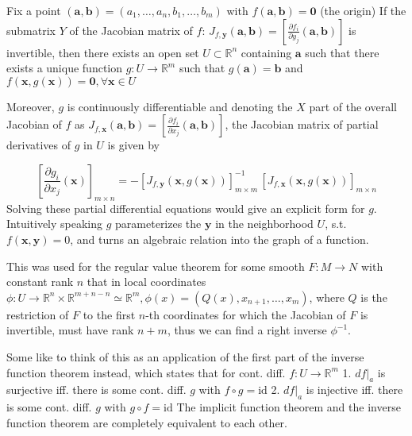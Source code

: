 Fix a point \( (\textbf{a}, \textbf{b}) = (a_1, \dots, a_n, b_1, \dots, b_m) \) with \( f(\textbf{a}, \textbf{b}) = \textbf{0} \) (the origin)
If the submatrix \( Y \) of the Jacobian matrix of \( f \):
\( J_{f, \mathbf{y}} (\mathbf{a}, \mathbf{b}) = \left [ \frac{\partial f_i}{\partial y_j} (\mathbf{a}, \mathbf{b}) \right ] \)
is invertible, then there exists an open set \( U \subset \mathbb{R}^n\) containing \( \textbf{a} \) such that there exists a unique function 
\( g: U \to \mathbb{R}^m \) such that \( g(\mathbf{a}) = \mathbf{b} \) and \( f(\mathbf{x}, g(\mathbf{x})) = \mathbf{0}, \forall \mathbf{x} \in U \)   

Moreover, \( g \) is continuously differentiable and denoting the \( X \) part of the overall Jacobian of \( f \) as
\(J_{f, \mathbf{x}} (\mathbf{a}, \mathbf{b}) = \left [ \frac{\partial f_i}{\partial x_j} (\mathbf{a}, \mathbf{b}) \right ]\),
the Jacobian matrix of partial derivatives of \( g \) in \( U \) is given by 

\[
\left[\frac{\partial g_i}{\partial x_j} (\mathbf{x})\right]_{m\times n} =- \left [ J_{f, \mathbf{y}}(\mathbf{x}, g(\mathbf{x})) \right ]_{m \times m} ^{-1} \, \left [ J_{f, \mathbf{x}}(\mathbf{x}, g(\mathbf{x})) \right ]_{m \times n}
\]
Solving these partial differential equations would give an explicit form for \( g \).
Intuitively speaking \( g \) parameterizes the \( \textbf{y} \) in the neighborhood \( U \), s.t. \( f(\textbf{x}, \textbf{y}) = 0 \),
and turns an algebraic relation into the graph of a function.


This was used for the regular value theorem for some smooth \( F : M \to N \) with constant rank \( n \) that 
in local coordinates \( \phi : U \to \mathbb{R}^{n} \times \mathbb{R}^{m+n-n} \simeq \mathbb{R}^{m}, \phi(x) = (Q(x), x_{n+1}, \dots, x_m) \),
where \( Q \) is the restriction of \( F \) to the first \( n \)-th coordinates for which the Jacobian of \( F \) is invertible,
must have rank \( n+m \), thus we can find a right inverse \( \phi^{-1} \).

Some like to think of this as an application of the first part of the inverse function theorem instead, which states
that for cont. diff. \( f : U \to \mathbb{R}^{m} \)
1. \( df|_a \) is surjective iff. there is some cont. diff. \( g \) with \( f \circ g = \text{id} \)
2. \( df|_a \) is injective iff. there is some cont. diff. \( g \) with \( g \circ f = \text{id} \)
The implicit function theorem and the inverse function theorem are completely equivalent to each other.


